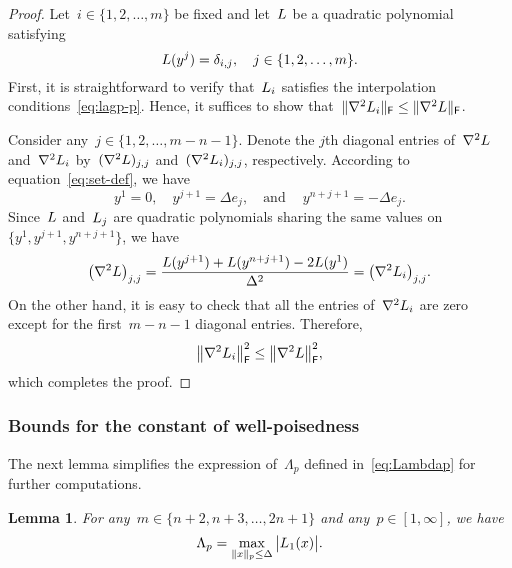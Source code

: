 \documentclass{article}
\numberwithin{equation}{section}
\theoremstyle{definition}
\theoremstyle{plain}
\newtheorem{lemma}{Lemma}[section]
\theoremstyle{remark}
\newcommand*{\abs}[2][]{#1\lvert#2#1\rvert}
\newcommand*{\lagp}[1][]{L\ifblank{#1}{}{_{#1}}}
\newcommand*{\norm}[2][]{#1\lVert#2#1\rVert}
\newcommand*{\set}[2][]{#1\{#2#1\}}
\begin{document}
\begin{proof}
    Let~$i \in \set{1, 2, \dots, m}$ be fixed and let~$\lagp$ be a quadratic polynomial satisfying
    \begin{equation}
        \label{eq:lagp-p}
        \lagp(y^j) = \delta_{i, j}, \quad j \in \set{1, 2, \dots, m}.
    \end{equation}
    First, it is straightforward to verify that~$\lagp[i]$ satisfies the interpolation conditions~\eqref{eq:lagp-p}.
    Hence, it suffices to show that~$\norm{\nabla^2 \lagp[i]}_\mathsf{F} \le \norm{\nabla^2 \lagp}_\mathsf{F}$.

    Consider any~$j\in\{1,2,\dots, m-n-1\}$.
    Denote the $j$th diagonal entries of~$\nabla^2 \lagp$ and~$\nabla^2 \lagp[i]$ by~$(\nabla^2\lagp)_{j,j}$ and~$(\nabla^2\lagp[i])_{j,j}$, respectively.
    According to equation~\eqref{eq:set-def}, we have
    \begin{equation*}
        y^1 = 0, \quad y^{j + 1} = \Delta e_j, \quad \text{and} \quad~y^{n + j + 1} = -\Delta e_j.
    \end{equation*}
    Since~$\lagp$ and~$\lagp[j]$ are quadratic polynomials sharing the same values on~$\{y^1, y^{j+1},
    y^{n+j+1}\}$, we have
    \begin{equation*}
        \big(\nabla^2 \lagp \big)_{j,j}
        = \frac{\lagp(y^{j + 1}) + \lagp(y^{n + j + 1}) - 2 \lagp(y^1)}{\Delta^2}
        = \big(\nabla^2 \lagp[i] \big)_{j,j}.
    \end{equation*}
    On the other hand, it is easy to check that all the entries of~$\nabla^2 \lagp[i]$ are zero
    except for the first~$m-n-1$ diagonal entries. Therefore,
    \begin{equation*}
        \norm[\big]{\nabla^2 \lagp[i]}_{\mathsf{F}}^2 \le \norm[\big]{\nabla^2 \lagp}_{\mathsf{F}}^2,
    \end{equation*}
    which completes the proof.
\end{proof}

\subsubsection{Bounds for the constant of well-poisedness}

The next lemma simplifies the expression of~$\Lambda_p$ defined in~\eqref{eq:Lambdap} for further computations.

\begin{lemma}
    \label{lem:lambda-p}
    For any~$m \in \set{n + 2, n + 3, \dots, 2n + 1}$ and any~$p \in [1, \infty]$, we have
    \begin{equation}
        \label{eq:lambda-p}
        \Lambda_p = \max_{\norm{x}_p \le \Delta} \abs[\big]{\lagp[1](x)}.
    \end{equation}
\end{lemma}
\end{document}
